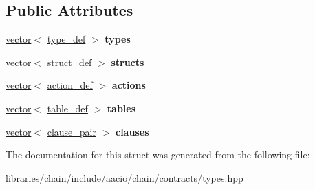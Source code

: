 \subsection*{Public Attributes}
\begin{DoxyCompactItemize}
\item 
\mbox{\label{structaacio_1_1chain_1_1contracts_1_1abi__def_af8c6ec8d6d85fb3de9c8cf15b54dbb4e}} 
\mbox{\hyperlink{classstd_1_1vector}{vector}}$<$ \mbox{\hyperlink{structaacio_1_1chain_1_1contracts_1_1type__def}{type\+\_\+def}} $>$ {\bfseries types}
\item 
\mbox{\label{structaacio_1_1chain_1_1contracts_1_1abi__def_aca9a6d1fe6f023e44113161cd8d689a0}} 
\mbox{\hyperlink{classstd_1_1vector}{vector}}$<$ \mbox{\hyperlink{structaacio_1_1chain_1_1contracts_1_1struct__def}{struct\+\_\+def}} $>$ {\bfseries structs}
\item 
\mbox{\label{structaacio_1_1chain_1_1contracts_1_1abi__def_a5008c3c6a310e62e8e79a8cb1bbb16ce}} 
\mbox{\hyperlink{classstd_1_1vector}{vector}}$<$ \mbox{\hyperlink{structaacio_1_1chain_1_1contracts_1_1action__def}{action\+\_\+def}} $>$ {\bfseries actions}
\item 
\mbox{\label{structaacio_1_1chain_1_1contracts_1_1abi__def_ac04ddf7e437f8514bae9d61cb7108df7}} 
\mbox{\hyperlink{classstd_1_1vector}{vector}}$<$ \mbox{\hyperlink{structaacio_1_1chain_1_1contracts_1_1table__def}{table\+\_\+def}} $>$ {\bfseries tables}
\item 
\mbox{\label{structaacio_1_1chain_1_1contracts_1_1abi__def_a01f69ae81e8f262d7b71ee634c887eea}} 
\mbox{\hyperlink{classstd_1_1vector}{vector}}$<$ \mbox{\hyperlink{structaacio_1_1chain_1_1contracts_1_1clause__pair}{clause\+\_\+pair}} $>$ {\bfseries clauses}
\end{DoxyCompactItemize}


The documentation for this struct was generated from the following file\+:\begin{DoxyCompactItemize}
\item 
libraries/chain/include/aacio/chain/contracts/types.\+hpp\end{DoxyCompactItemize}
